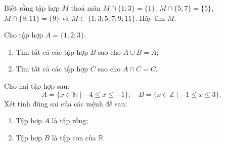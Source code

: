 \begin{bt}%
	Biết rằng tập hợp $M$ thoả mãn $M \cap \big\{1;3\big\}=\big\{1\big\}$, $M \cap \big\{5;7\big\}=\big\{5\big\}$, $M \cap \big\{9;11\big\}=\big\{9\big\}$ và $M \subset \big\{1;3;5;7;9;11\big\}$. Hãy tìm $M$.
\end{bt}

\begin{bt}%
	Cho tập hợp $A=\big\{1;2;3\big\}$.
	\begin{enumerate}
		\item Tìm tất cả các tập hợp $B$ sao cho $A \cup B=A$;
		\item Tìm tất cả các tập hợp $C$ sao cho $A \cap C=C$.
	\end{enumerate}
\end{bt}

\begin{bt}%
	Cho hai tập hợp sau:
	$$
	A=\{x \in \mathbb{N} \mid-4 \leq x \leq-1\} ; \quad B=\{x \in \mathbb{Z} \mid-1 \leq x \leq 3\} .
	$$
	Xét tính đúng sai của các mệnh đề sau:
	\begin{enumerate}
		\item 	Tập hợp $A$ là tập rỗng;
		\item 	Tập hợp $B$ là tập con của $\mathbb{R}$.
	\end{enumerate}
\end{bt}

